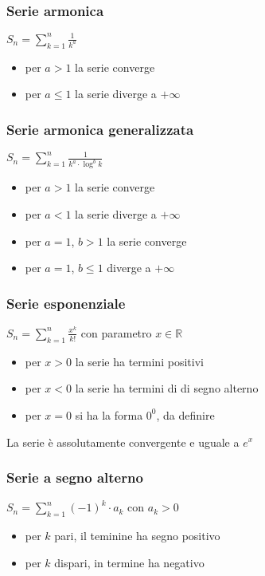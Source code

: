 \documentclass[a4paper]{article}
\begin{document}
\subsubsection*{Serie armonica}
\(\displaystyle S_n = \sum_{k = 1}^{n} \frac{1}{k^a}\)
\begin{itemize}
	\item per \(a > 1\) la serie converge
	\item per \(a \leq 1\) la serie diverge a \(+ \infty\)
\end{itemize}

\subsubsection*{Serie armonica generalizzata}
\(\displaystyle S_n = \sum_{k = 1}^{n} \frac{1}{k^a \cdot \log^b k}\)
\begin{itemize}
	\item per \(a > 1\) la serie converge
	\item per \(a < 1\) la serie diverge a \(+ \infty\)
	\item per \(a = 1\), \(b > 1\) la serie converge
	\item per \(a = 1\), \(b \leq 1\) diverge a \(+ \infty\)
\end{itemize}

\subsubsection*{Serie esponenziale}
\(\displaystyle S_n = \sum_{k = 1}^{n} \frac{x^k}{k!}\) con parametro \(x \in \mathbb{R}\)
\begin{itemize}
	\item per \(x > 0\) la serie ha termini positivi
	\item per \(x < 0\) la serie ha termini di di segno alterno
	\item per \(x = 0\) si ha la forma \(0^0\), da definire
\end{itemize}
La serie è assolutamente convergente e uguale a \(e^x\)

\subsubsection*{Serie a segno alterno}
\(\displaystyle S_n = \sum_{k = 1}^{n} (-1)^k \cdot a_k\) con \(a_k > 0\)
\begin{itemize}
	\item per \(k\) pari, il teminine ha segno positivo
	\item per \(k\) dispari, in termine ha negativo
\end{itemize}
\end{document}
